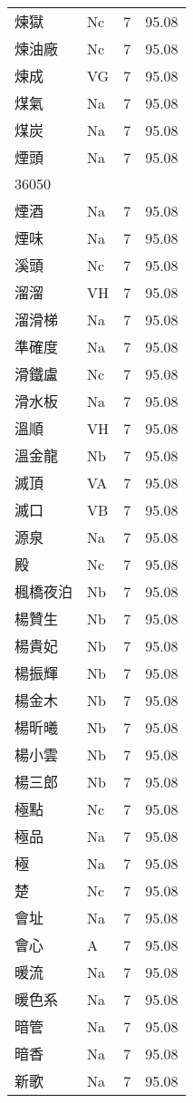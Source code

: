 \documentclass[twocolumn]{book}
\begin{document}
\begin{supertabular}{llrr}
煉獄 & Nc & 7 &  95.08\\
煉油廠 & Nc & 7 &  95.08\\
煉成 & VG & 7 &  95.08\\
煤氣 & Na & 7 &  95.08\\
煤炭 & Na & 7 &  95.08\\
煙頭 & Na & 7 &  95.08\\
36050\\
煙酒 & Na & 7 &  95.08\\
煙味 & Na & 7 &  95.08\\
溪頭 & Nc & 7 &  95.08\\
溜溜 & VH & 7 &  95.08\\
溜滑梯 & Na & 7 &  95.08\\
準確度 & Na & 7 &  95.08\\
滑鐵盧 & Nc & 7 &  95.08\\
滑水板 & Na & 7 &  95.08\\
溫順 & VH & 7 &  95.08\\
溫金龍 & Nb & 7 &  95.08\\
滅頂 & VA & 7 &  95.08\\
滅口 & VB & 7 &  95.08\\
源泉 & Na & 7 &  95.08\\
殿 & Nc & 7 &  95.08\\
楓橋夜泊 & Nb & 7 &  95.08\\
楊贊生 & Nb & 7 &  95.08\\
楊貴妃 & Nb & 7 &  95.08\\
楊振輝 & Nb & 7 &  95.08\\
楊金木 & Nb & 7 &  95.08\\
楊昕曦 & Nb & 7 &  95.08\\
楊小雲 & Nb & 7 &  95.08\\
楊三郎 & Nb & 7 &  95.08\\
極點 & Nc & 7 &  95.08\\
極品 & Na & 7 &  95.08\\
極 & Na & 7 &  95.08\\
楚 & Nc & 7 &  95.08\\
會址 & Na & 7 &  95.08\\
會心 & A & 7 &  95.08\\
暖流 & Na & 7 &  95.08\\
暖色系 & Na & 7 &  95.08\\
暗管 & Na & 7 &  95.08\\
暗香 & Na & 7 &  95.08\\
新歌 & Na & 7 &  95.08\\

\end{supertabular}
\end{document}
